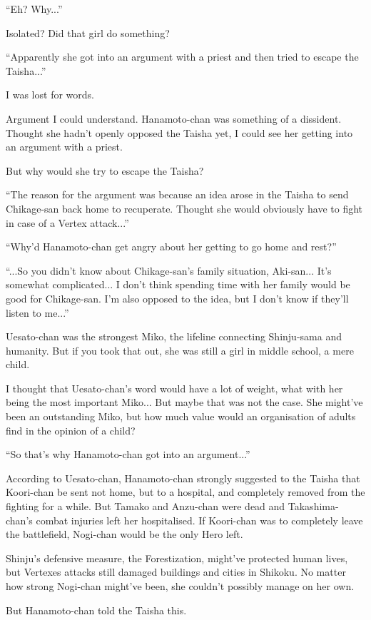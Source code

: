 ``Eh? Why...''

Isolated? Did that girl do something?

``Apparently she got into an argument with a priest and then tried to escape the Taisha...''

I was lost for words.

Argument I could understand. Hanamoto-chan was something of a dissident. Thought she hadn't openly opposed the Taisha yet, I could see her getting into an argument with a priest.

But why would she try to escape the Taisha?

``The reason for the argument was because an idea arose in the Taisha to send Chikage-san back home to recuperate. Thought she would obviously have to fight in case of a Vertex attack...''

``Why'd Hanamoto-chan get angry about her getting to go home and rest?''

``...So you didn't know about Chikage-san's family situation, Aki-san... It's somewhat complicated... I don't think spending time with her family would be good for Chikage-san. I'm also opposed to the idea, but I don't know if they'll listen to me...''

Uesato-chan was the strongest Miko, the lifeline connecting Shinju-sama and humanity. But if you took that out, she was still a girl in middle school, a mere child.

I thought that Uesato-chan's word would have a lot of weight, what with her being the most important Miko... But maybe that was not the case. She might've been an outstanding Miko, but how much value would an organisation of adults find in the opinion of a child?

``So that's why Hanamoto-chan got into an argument...''

According to Uesato-chan, Hanamoto-chan strongly suggested to the Taisha that Koori-chan be sent not home, but to a hospital, and completely removed from the fighting for a while. But Tamako and Anzu-chan were dead and Takashima-chan's combat injuries left her hospitalised. If Koori-chan was to completely leave the battlefield, Nogi-chan would be the only Hero left.

Shinju's defensive measure, the Forestization, might've protected human lives, but Vertexes attacks still damaged buildings and cities in Shikoku. No matter how strong Nogi-chan might've been, she couldn't possibly manage on her own.

But Hanamoto-chan told the Taisha this.

